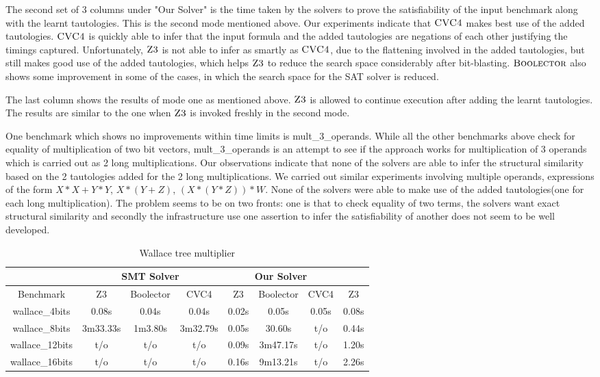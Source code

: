 The second set of 3 columns under "Our Solver" is the time taken by the solvers to prove the satisfiability of the input benchmark along with the learnt tautologies. This is the second mode mentioned above. Our experiments indicate that $\textsc{CVC4}$ makes best use of the added tautologies. $\textsc{CVC4}$ is quickly able to infer that the input formula and the added tautologies are negations of each other justifying the timings captured. Unfortunately, $\textsc{Z3}$ is not able to infer as smartly as $\textsc{CVC4}$, due to the flattening involved in the added tautologies, but still makes good use of the added tautologies, which helps $\textsc{Z3}$ to reduce the search space considerably after bit-blasting. $\textsc{Boolector}$ also shows some improvement in some of the cases, in which the search space for the SAT solver is reduced.

The last column shows the results of mode one as mentioned above. $\textsc{Z3}$ is allowed to continue execution after adding the learnt tautologies. The results are similar to the one when $\textsc{Z3}$ is invoked freshly in the second mode.

One benchmark which shows no improvements within time limits is mult\_3\_operands. While all the other benchmarks above check for equality of multiplication of two bit vectors, mult\_3\_operands is an attempt to see if the approach works for multiplication of 3 operands which is carried out as 2 long multiplications. Our observations indicate that none of the solvers are able to infer the structural similarity based on the 2 tautologies added for the 2 long multiplications. We carried out similar experiments involving multiple operands, expressions of the form $X*X + Y*Y$, $X*(Y+Z)$, $(X*(Y*Z))*W$. None of the solvers were able to make use of the added tautologies(one for each long multiplication). The problem seems to be on two fronts: one is that to check equality of two terms, the solvers want exact structural similarity and secondly the infrastructure use one assertion to infer the satisfiability of another does not seem to be well developed. 


\begin{table}[]
\centering
\caption{Wallace tree multiplier}
\label{my-label}
\begin{tabular}{|c|c|c|c|c|c|c|c|}
\hline
                & \multicolumn{3}{c|}{SMT Solver} & \multicolumn{3}{c|}{Our Solver} &       \\ \hline
Benchmark       & Z3       & Boolector & CVC4     & Z3      & Boolector   & CVC4    & Z3    \\ \hline
wallace\_4bits  & 0.08s    & 0.04s     & 0.04s    & 0.02s   & 0.05s       & 0.05s   & 0.08s \\ \hline
wallace\_8bits  & 3m33.33s & 1m3.80s   & 3m32.79s & 0.05s   & 30.60s      & t/o     & 0.44s \\ \hline
wallace\_12bits & t/o      & t/o       & t/o      & 0.09s   & 3m47.17s    & t/o     & 1.20s \\ \hline
wallace\_16bits & t/o      & t/o       & t/o      & 0.16s   & 9m13.21s   & t/o     & 2.26s \\ \hline
\end{tabular}
\end{table}


